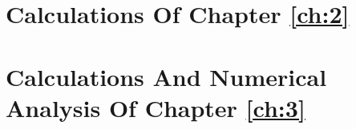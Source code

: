 \documentclass[12pt]{report}
\begin{document}
\begin{appendices}
\chapter{Calculations Of Chapter \ref{ch:2}}

\chapter{Calculations And Numerical Analysis Of Chapter \ref{ch:3}}







\end{appendices}


\newpage
\printbibliography 
\end{document}
